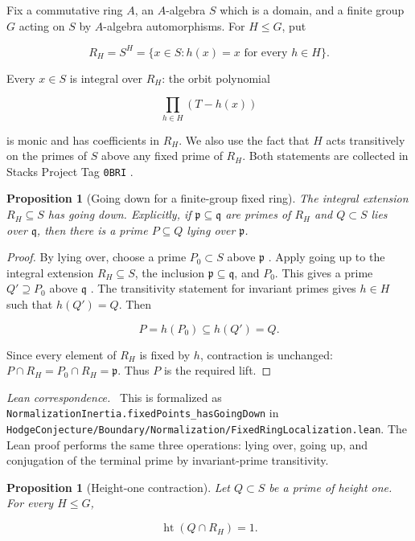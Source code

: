 \documentclass[11pt]{article}
\newtheorem{proposition}[theorem]{Proposition}
\theoremstyle{remark}
\DeclareMathOperator{\htop}{ht}
\newcommand{\p}{\mathfrak p}
\newcommand{\q}{\mathfrak q}
\newcommand{\leanpath}[1]{\texttt{\nolinkurl{#1}}}
\newcommand{\leansrc}[1]{%
  \leanpath{HodgeConjecture/Boundary/Normalization/#1}}
\newenvironment{leanfiles}
  {\par\medskip\begingroup\footnotesize\raggedright\noindent
   \textit{Lean correspondence.}\ }
  {\par\endgroup\medskip}
\begin{document}
Fix a commutative ring \(A\), an \(A\)-algebra \(S\) which is a domain,
and a finite group \(G\) acting on \(S\) by \(A\)-algebra automorphisms.
For \(H\leq G\), put

\[
  R_H=S^H=\{x\in S:h(x)=x\text{ for every }h\in H\}.
\]

Every \(x\in S\) is integral over \(R_H\): the orbit polynomial

\[
  \prod_{h\in H}(T-h(x))
\]

is monic and has coefficients in \(R_H\).  We also use the fact that
\(H\) acts transitively on the primes of \(S\) above any fixed prime of
\(R_H\).  Both statements are collected in Stacks Project
Tag \texttt{0BRI} \cite{StacksInvariantPrimeTransitivity}.

\begin{proposition}[Going down for a finite-group fixed ring]
\label{prop:going-down}
The integral extension \(R_H\subseteq S\) has going down.  Explicitly, if
\(\p\subseteq\q\) are primes of \(R_H\) and \(Q\subset S\) lies over
\(\q\), then there is a prime \(P\subseteq Q\) lying over \(\p\).
\end{proposition}

\begin{proof}
By lying over, choose a prime \(P_0\subset S\) above \(\p\)
\cite{StacksLyingOver}.  Apply going up to the integral extension
\(R_H\subseteq S\), the inclusion \(\p\subseteq\q\), and \(P_0\).  This
gives a prime \(Q'\supseteq P_0\) above \(\q\) \cite{StacksGoingUp}.  The
transitivity statement for invariant primes gives \(h\in H\) such that
\(h(Q')=Q\).  Then

\[
  P=h(P_0)\subseteq h(Q')=Q.
\]

Since every element of \(R_H\) is fixed by \(h\), contraction is unchanged:
\(P\cap R_H=P_0\cap R_H=\p\).  Thus \(P\) is the required lift.
\end{proof}

\begin{leanfiles}
This is formalized as
\leanpath{NormalizationInertia.fixedPoints_hasGoingDown} in
\leansrc{FixedRingLocalization.lean}.  The Lean proof performs the same
three operations: lying over, going up, and conjugation of the terminal
prime by invariant-prime transitivity.
\end{leanfiles}

\begin{proposition}[Height-one contraction]
\label{prop:height-one}
Let \(Q\subset S\) be a prime of height one.  For every \(H\leq G\),

\[
  \htop(Q\cap R_H)=1.
\]
\end{proposition}
\end{document}
